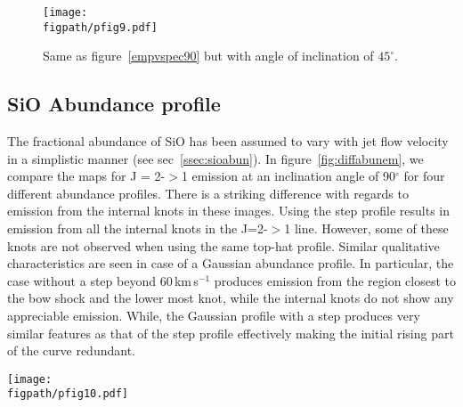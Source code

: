 \documentclass[useAMS,usenatbib]{mn2e}
\newcommand{\figpath}{/home/phybva/SiOJets_New/PAPER/NEWFIGS}
\begin{document}

\begin{figure}
 \texttt{[image: \\figpath/pfig9.pdf]}%
 \caption{Same as figure~\ref{empvspec90} but with angle of
   inclination of $45^{\circ}$.} 
\label{empvspec45}
\end{figure}




\subsection{SiO Abundance profile}
\label{ssec:sioabunem}
The fractional abundance of SiO has been assumed to vary with jet flow velocity in
a simplistic manner (see sec~\ref{ssec:sioabun}). In
figure~\ref{fig:diffabunem}, we compare the maps for J = 2-$>$1
emission at an inclination angle of 90$^{\circ}$ for four different abundance profiles. 
There is a striking difference with regards to
emission from the internal knots in these images. Using the step profile results in
emission from  all the internal knots in the J=2-$>$1 line. However, some of
these knots are not observed when using the same top-hat profile. 
Similar qualitative characteristics are seen in case of a Gaussian
abundance profile. In particular, the case without a step beyond 60\,km\,s$^{-1}$
produces emission from the region closest to the bow shock and the lower most knot, 
while the internal knots do not show any appreciable emission. While, the 
Gaussian profile with a step produces very similar
features as that of the step profile effectively making the initial rising part 
of the curve redundant. 
%

\begin{figure*}
 \texttt{[image: \\figpath/pfig10.pdf]}%
 \caption{Variation of SiO(2-1) emission for runs with molecular
   cooling having different abundance profiles.}
\label{fig:diffabunem}
\end{figure*}
\end{document}
